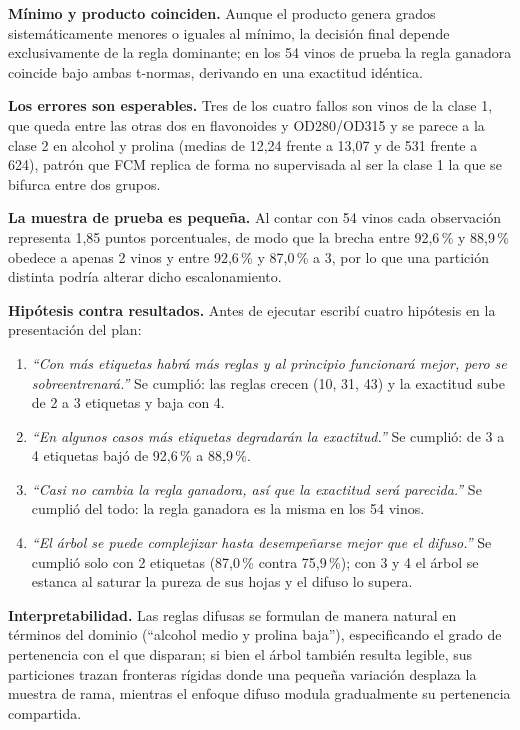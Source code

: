 \documentclass[11pt,letterpaper]{article}
\begin{document}
\textbf{Mínimo y producto coinciden.} Aunque el producto genera grados sistemáticamente menores o iguales al mínimo, la decisión final depende exclusivamente de la regla dominante; en los 54 vinos de prueba la regla ganadora coincide bajo ambas t-normas, derivando en una exactitud idéntica.

\textbf{Los errores son esperables.} Tres de los cuatro fallos son vinos de la clase 1, que queda entre las otras dos en flavonoides y OD280/OD315 y se parece a la clase 2 en alcohol y prolina (medias de 12,24 frente a 13,07 y de 531 frente a 624), patrón que FCM replica de forma no supervisada al ser la clase 1 la que se bifurca entre dos grupos.

\textbf{La muestra de prueba es pequeña.} Al contar con 54 vinos cada observación representa 1,85 puntos porcentuales, de modo que la brecha entre 92,6\,\% y 88,9\,\% obedece a apenas 2 vinos y entre 92,6\,\% y 87,0\,\% a 3, por lo que una partición distinta podría alterar dicho escalonamiento.

\textbf{Hipótesis contra resultados.} Antes de ejecutar escribí cuatro hipótesis en la presentación del plan:
\begin{enumerate}
\item \textit{``Con más etiquetas habrá más reglas y al principio funcionará mejor, pero se sobreentrenará.''} Se cumplió: las reglas crecen (10, 31, 43) y la exactitud sube de 2 a 3 etiquetas y baja con 4.
\item \textit{``En algunos casos más etiquetas degradarán la exactitud.''} Se cumplió: de 3 a 4 etiquetas bajó de 92,6\,\% a 88,9\,\%.
\item \textit{``Casi no cambia la regla ganadora, así que la exactitud será parecida.''} Se cumplió del todo: la regla ganadora es la misma en los 54 vinos.
\item \textit{``El árbol se puede complejizar hasta desempeñarse mejor que el difuso.''} Se cumplió solo con 2 etiquetas (87,0\,\% contra 75,9\,\%); con 3 y 4 el árbol se estanca al saturar la pureza de sus hojas y el difuso lo supera.
\end{enumerate}

\textbf{Interpretabilidad.} Las reglas difusas se formulan de manera natural en términos del dominio (``alcohol medio y prolina baja''), especificando el grado de pertenencia con el que disparan; si bien el árbol también resulta legible, sus particiones trazan fronteras rígidas donde una pequeña variación desplaza la muestra de rama, mientras el enfoque difuso modula gradualmente su pertenencia compartida.
\end{document}
